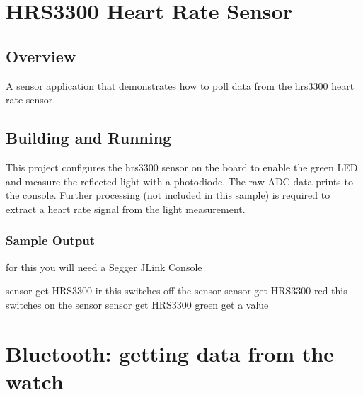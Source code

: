 \documentclass[letterpaper,10pt,english]{sphinxmanual}
\begin{document}
\section{HRS3300 Heart Rate Sensor}
\label{\detokenize{samples/README:hrs3300-heart-rate-sensor}}\label{\detokenize{samples/README:hrs3300}}\label{\detokenize{samples/README::doc}}

\subsection{Overview}
\label{\detokenize{samples/README:overview}}
A sensor application that demonstrates how to poll data from the hrs3300 heart
rate sensor.


\subsection{Building and Running}
\label{\detokenize{samples/README:building-and-running}}
This project configures the hrs3300 sensor on the  board to
enable the green LED and measure the reflected light with a photodiode. The raw
ADC data prints to the console. Further processing (not included in this
sample) is required to extract a heart rate signal from the light measurement.


\subsubsection{Sample Output}
\label{\detokenize{samples/README:sample-output}}
for this you will need a Segger JLink Console

\begin{sphinxVerbatim}[commandchars=\\\{\}]
 sensor get HRS3300  ir \PYGZhy{}\PYGZhy{} this switches off the sensor
 sensor get HRS3300  red \PYGZhy{}\PYGZhy{} this switches on the sensor
 sensor get HRS3300  green \PYGZhy{}\PYGZhy{} get a value
\end{sphinxVerbatim}


\section{Bluetooth: getting data from the watch}
\label{\detokenize{samples/samplesbluetoothperipheral-notificationREADME:bluetooth-getting-data-from-the-watch}}\label{\detokenize{samples/samplesbluetoothperipheral-notificationREADME:ble-peripheral}}\label{\detokenize{samples/samplesbluetoothperipheral-notificationREADME::doc}}
\end{document}
